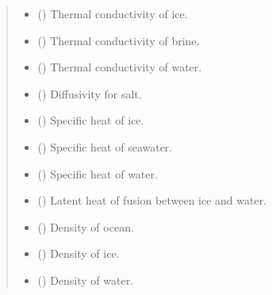 \documentclass[a4paper,11pt,english,openany]{sphinxmanual}
\begin{document}
\begin{fulllineitems}
\begin{quote}
\begin{description}
\begin{itemize}
\item {} 
\sphinxAtStartPar
{} () \textendash{} Thermal conductivity of ice.

\item {} 
\sphinxAtStartPar
{} () \textendash{} Thermal conductivity of brine.

\item {} 
\sphinxAtStartPar
{} () \textendash{} Thermal conductivity of water.

\item {} 
\sphinxAtStartPar
{} () \textendash{} Diffusivity for salt.

\item {} 
\sphinxAtStartPar
{} () \textendash{} Specific heat of ice.

\item {} 
\sphinxAtStartPar
{} () \textendash{} Specific heat of seawater.

\item {} 
\sphinxAtStartPar
{} () \textendash{} Specific heat of water.

\item {} 
\sphinxAtStartPar
{} () \textendash{} Latent heat of fusion between ice and water.

\item {} 
\sphinxAtStartPar
{} () \textendash{} Density of ocean.

\item {} 
\sphinxAtStartPar
{} () \textendash{} Density of ice.

\item {} 
\sphinxAtStartPar
{} () \textendash{} Density of water.


\end{itemize}
\end{description}
\end{quote}
\end{fulllineitems}
\end{document}

